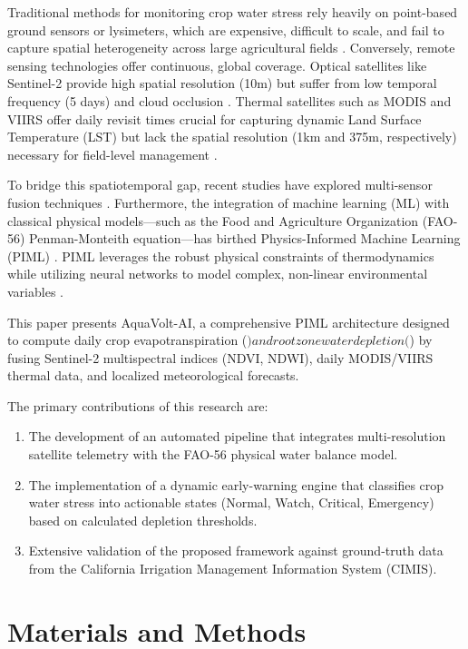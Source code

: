 \documentclass[10pt,twocolumn,letterpaper]{article}
\begin{document}
Traditional methods for monitoring crop water stress rely heavily on point-based ground sensors or lysimeters, which are expensive, difficult to scale, and fail to capture spatial heterogeneity across large agricultural fields \cite{ref4}. Conversely, remote sensing technologies offer continuous, global coverage. Optical satellites like Sentinel-2 provide high spatial resolution (10m) but suffer from low temporal frequency (5 days) and cloud occlusion \cite{ref5, ref6}. Thermal satellites such as MODIS and VIIRS offer daily revisit times crucial for capturing dynamic Land Surface Temperature (LST) but lack the spatial resolution (1km and 375m, respectively) necessary for field-level management \cite{ref7, ref8}.

To bridge this spatiotemporal gap, recent studies have explored multi-sensor fusion techniques \cite{ref9}. Furthermore, the integration of machine learning (ML) with classical physical models—such as the Food and Agriculture Organization (FAO-56) Penman-Monteith equation—has birthed Physics-Informed Machine Learning (PIML) \cite{ref10}. PIML leverages the robust physical constraints of thermodynamics while utilizing neural networks to model complex, non-linear environmental variables \cite{ref11, ref12}.

This paper presents AquaVolt-AI, a comprehensive PIML architecture designed to compute daily crop evapotranspiration ($) and root zone water depletion ($) by fusing Sentinel-2 multispectral indices (NDVI, NDWI), daily MODIS/VIIRS thermal data, and localized meteorological forecasts. 

The primary contributions of this research are:
\begin{enumerate}
    \item The development of an automated pipeline that integrates multi-resolution satellite telemetry with the FAO-56 physical water balance model.
    \item The implementation of a dynamic early-warning engine that classifies crop water stress into actionable states (Normal, Watch, Critical, Emergency) based on calculated depletion thresholds.
    \item Extensive validation of the proposed framework against ground-truth data from the California Irrigation Management Information System (CIMIS).
\end{enumerate}

\section{Materials and Methods}\label{sec2}
\end{document}
